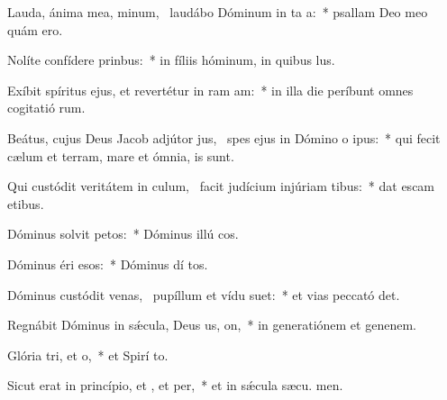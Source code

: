 \item Lauda, ánima mea, minum,~\pscross{} laudábo Dóminum in ta a:~* psallam Deo meo quám ero.
\item Nolíte confídere  prinbus:~* in fíliis hóminum, in quibus   lus.
\item Exíbit spíritus ejus, et revertétur in ram am:~* in illa die períbunt omnes cogitatió rum.
\item Beátus, cujus Deus Jacob adjútor jus,~\pscross{} spes ejus in Dómino o ipus:~* qui fecit cælum et terram, mare et ómnia,   is sunt.
\item Qui custódit veritátem in culum,~\pscross{} facit judícium injúriam tibus:~* dat escam etibus.
\item Dóminus solvit petos:~* Dóminus illú cos.
\item Dóminus éri esos:~* Dóminus dí tos.
\item Dóminus custódit venas,~\pscross{} pupíllum et vídu suet:~* et vias peccató det.
\item Regnábit Dóminus in sǽcula, Deus us, on,~* in generatiónem et genenem.
\item Glória tri, et o,~* et Spirí to.
\item Sicut erat in princípio, et , et per,~* et in sǽcula sæcu. men.

